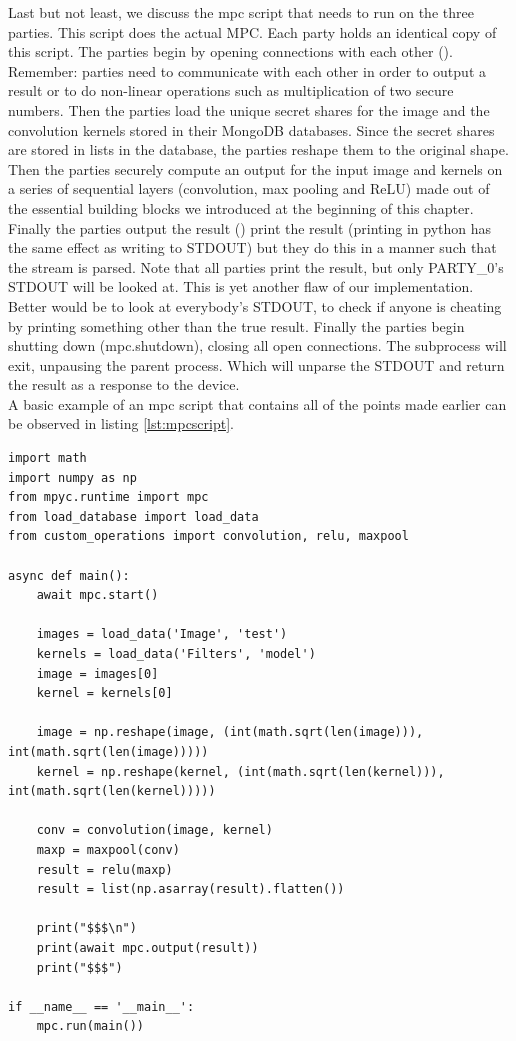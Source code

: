 Last but not least, we discuss the mpc script that needs to run on the three parties. This script does the actual MPC. Each party holds an identical copy of this script. The parties begin by opening connections with each other (). Remember: parties need to communicate with each other in order to output a result or to do non-linear operations such as multiplication of two secure numbers. Then the parties load the unique secret shares for the image and the convolution kernels stored in their MongoDB databases. Since the secret shares are stored in lists in the database, the parties reshape them to the original shape. Then the parties securely compute an output for the input image and kernels on a series of sequential layers (convolution, max pooling and ReLU) made out of the essential building blocks we introduced at the beginning of this chapter. Finally the parties output the result () print the result (printing in python has the same effect as writing to STDOUT) but they do this in a manner such that the stream is parsed. Note that all parties print the result, but only PARTY\_0's STDOUT will be looked at. This is yet another flaw of our implementation. Better would be to look at everybody's STDOUT, to check if anyone is cheating by printing something other than the true result. Finally the parties begin shutting down (mpc.shutdown), closing all open connections. The subprocess will exit, unpausing the parent process. Which will unparse the STDOUT and return the result as a response to the device.\\

 A basic example of an mpc script that contains all of the points made earlier can be observed in listing \ref{lst:mpcscript}.

\begin{lstlisting}[caption={Example of MPC script for a single CNN layer (conv,maxp and relu)}, label={lst:mpcscript}, frame=single, breaklines=true]
import math
import numpy as np
from mpyc.runtime import mpc
from load_database import load_data
from custom_operations import convolution, relu, maxpool

async def main():
    await mpc.start()

    images = load_data('Image', 'test')
    kernels = load_data('Filters', 'model')
    image = images[0]
    kernel = kernels[0]

    image = np.reshape(image, (int(math.sqrt(len(image))), int(math.sqrt(len(image)))))
    kernel = np.reshape(kernel, (int(math.sqrt(len(kernel))), int(math.sqrt(len(kernel)))))

    conv = convolution(image, kernel)
    maxp = maxpool(conv)
    result = relu(maxp)
    result = list(np.asarray(result).flatten())

    print("$$$\n")
    print(await mpc.output(result))
    print("$$$")

if __name__ == '__main__':
    mpc.run(main())
\end{lstlisting}


